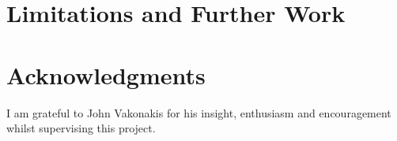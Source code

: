 \documentclass[fleqn,10pt]{article} %
\begin{document}



\section{Limitations and Further Work}


\section*{Acknowledgments}

I am grateful to John Vakonakis for his insight, enthusiasm and encouragement whilst supervising this project.





\end{document}
